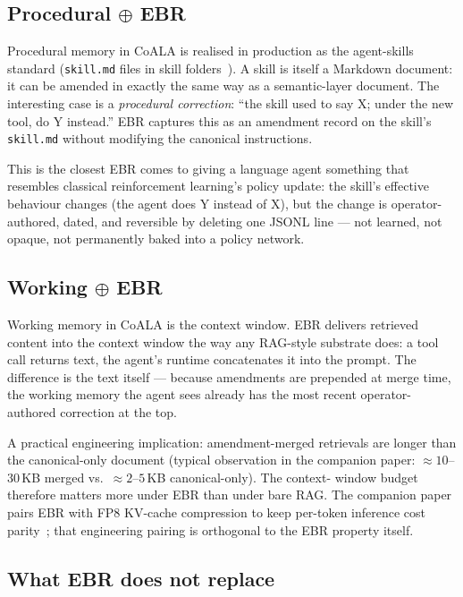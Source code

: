 \documentclass[11pt,a4paper]{article}
\begin{document}
\subsection{Procedural $\oplus$ EBR}
\label{sec:procedural-plus-ebr}

\noindent
Procedural memory in CoALA is realised in production as the agent-skills standard
(\texttt{skill.md} files in skill folders~\cite{anthropic2024skills}). A skill is itself
a Markdown document: it can be amended in exactly the same way as a semantic-layer
document. The interesting case is a \emph{procedural correction}: ``the skill used to
say X; under the new tool, do Y instead.'' EBR captures this as an amendment record on
the skill's \texttt{skill.md} without modifying the canonical instructions.

This is the closest EBR comes to giving a language agent something that resembles
classical reinforcement learning's policy update: the skill's effective behaviour
changes (the agent does Y instead of X), but the change is operator-authored, dated,
and reversible by deleting one JSONL line --- not learned, not opaque, not
permanently baked into a policy network.

\subsection{Working $\oplus$ EBR}
\label{sec:working-plus-ebr}

\noindent
Working memory in CoALA is the context window. EBR delivers retrieved content into the
context window the way any RAG-style substrate does: a tool call returns text, the
agent's runtime concatenates it into the prompt. The difference is the text itself ---
because amendments are prepended at merge time, the working memory the agent sees
already has the most recent operator-authored correction at the top.

A practical engineering implication: amendment-merged retrievals are longer than the
canonical-only document (typical observation in the companion paper:
$\approx\!10$--$30$\,KB merged vs.\ $\approx\!2$--$5$\,KB canonical-only). The context-
window budget therefore matters more under EBR than under bare RAG. The companion paper
pairs EBR with FP8 KV-cache compression to keep per-token inference cost
parity~\cite{turboquant2026}; that engineering pairing is orthogonal to the EBR property
itself.

\subsection{What EBR does not replace}
\end{document}
